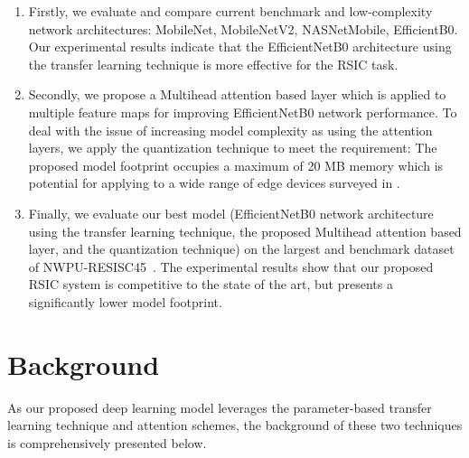 \documentclass[sigconf]{acmart}
\begin{document}
\begin{enumerate}
\item Firstly, we evaluate and compare current benchmark and low-complexity network architectures: MobileNet, MobileNetV2, NASNetMobile, EfficientB0.
Our experimental results indicate that the EfficientNetB0 architecture using the transfer learning technique is more effective for the RSIC task.\\

\item Secondly, we propose a Multihead attention based layer which is applied to multiple feature maps for improving EfficientNetB0 network performance. 
To deal with the issue of increasing model complexity as using the attention layers, we apply the quantization technique to meet the requirement:  The proposed model footprint occupies a maximum of 20 MB memory which is potential for applying to a wide range of edge devices surveyed in \cite{sun2021mind}. \\ 

\item Finally, we evaluate our best model (EfficientNetB0 network architecture using the transfer learning technique, the proposed Multihead attention based layer, and the quantization technique) on the largest and benchmark dataset of NWPU-RESISC45~\cite{cheng2017remote}.  
The experimental results show that our proposed RSIC system is competitive to the state of the art, but presents a significantly lower model footprint. 
\end{enumerate}

\section{Background}

As our proposed deep learning model leverages the parameter-based transfer learning technique and attention schemes, the background of these two techniques is comprehensively presented below.
\end{document}
